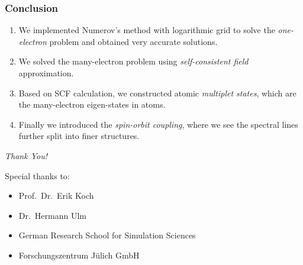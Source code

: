 \begin{frame}[t]
  \frametitle{Conclusion}
  \small
  \begin{enumerate}
    \item We implemented Numerov's method with logarithmic grid to solve
    the \emph{one-electron} problem and obtained very accurate solutions.
    \item We solved the many-electron problem using \emph{self-consistent field} approximation.
    \item Based on SCF calculation, we constructed atomic \emph{multiplet states},
    which are the many-electron eigen-states in atoms.
    \item Finally we introduced the \emph{spin-orbit coupling}, where we see the
    spectral lines further split into finer structures.
  \end{enumerate}
\end{frame}

\begin{frame}[t]
  \begin{center}
    \Huge \emph{Thank You!}
  \end{center}
    Special thanks to: \newline
  \begin{itemize}
    \item {Prof.\ Dr.\ Erik Koch}
    \item {Dr.\ Hermann Ulm}
    \item {German Research School for Simulation Sciences}
    \item {Forschungszentrum J\"{u}lich GmbH}
  \end{itemize}
\end{frame}